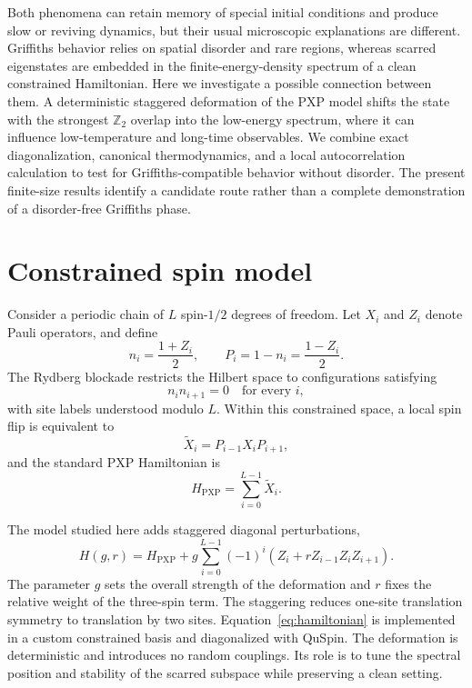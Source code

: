 \documentclass[11pt]{article}
\newcommand{\Hpxp}{H_{\mathrm{PXP}}}
\newcommand{\Ztwo}{\mathbb{Z}_2}
\newcommand{\Xtilde}{\widetilde{X}}
\begin{document}
Both phenomena can retain memory of special initial conditions and produce slow or
reviving dynamics, but their usual microscopic explanations are different. Griffiths
behavior relies on spatial disorder and rare regions, whereas scarred eigenstates are
embedded in the finite-energy-density spectrum of a clean constrained Hamiltonian.
Here we investigate a possible connection between them. A deterministic staggered
deformation of the PXP model shifts the state with the strongest $\Ztwo$ overlap into
the low-energy spectrum, where it can influence low-temperature and long-time
observables. We combine exact diagonalization, canonical thermodynamics, and a local
autocorrelation calculation to test for Griffiths-compatible behavior without
disorder. The present finite-size results identify a candidate route rather than a
complete demonstration of a disorder-free Griffiths phase.

\section{Constrained spin model}

Consider a periodic chain of $L$ spin-$1/2$ degrees of freedom. Let $X_i$ and
$Z_i$ denote Pauli operators, and define
\begin{equation}
  n_i=\frac{1+Z_i}{2},
  \qquad
  P_i=1-n_i=\frac{1-Z_i}{2}.
\end{equation}
The Rydberg blockade restricts the Hilbert space to configurations satisfying
\begin{equation}
  n_i n_{i+1}=0
  \quad \text{for every }i,
\end{equation}
with site labels understood modulo $L$. Within this constrained space, a local spin
flip is equivalent to
\begin{equation}
  \Xtilde_i=P_{i-1}X_iP_{i+1},
\end{equation}
and the standard PXP Hamiltonian is
\begin{equation}
  \Hpxp=\sum_{i=0}^{L-1}\Xtilde_i.
\end{equation}

The model studied here adds staggered diagonal perturbations,
\begin{equation}
  H(g,r)=\Hpxp
  +g\sum_{i=0}^{L-1}(-1)^i
  \left(Z_i+r Z_{i-1}Z_iZ_{i+1}\right).
  \label{eq:hamiltonian}
\end{equation}
The parameter $g$ sets the overall strength of the deformation and $r$ fixes the
relative weight of the three-spin term. The staggering reduces one-site translation
symmetry to translation by two sites. Equation~\eqref{eq:hamiltonian} is implemented
in a custom constrained basis and diagonalized with QuSpin. The deformation is
deterministic and introduces no random couplings. Its role is to tune the spectral
position and stability of the scarred subspace while preserving a clean setting.
\end{document}
